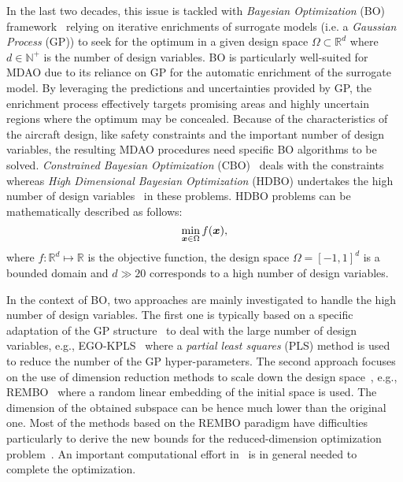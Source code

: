In the last two decades, this issue is tackled with \textit{Bayesian Optimization} (BO) framework~\cite{frazierTutorialBayesianOptimization2018,JonesEfficientglobaloptimization1998,MockusBayesianmethodsseeking1975,ShahriariTakingHumanOut2016} relying on iterative enrichments of surrogate models (i.e. a \textit{Gaussian Process} (GP)) to seek for the optimum in a given design space $\Omega \subset \mathbb{R}^d$ where $d \in \mathbb{N}^+$ is the number of design variables. 
{\color{black} BO is particularly well-suited for MDAO due to its reliance on GP for the automatic enrichment of the surrogate model. 
By leveraging the predictions and uncertainties provided by GP, the enrichment process effectively targets promising areas and highly uncertain regions where the optimum may be concealed.}
Because of the characteristics of the aircraft design, like safety constraints and the important number of design variables, the resulting MDAO procedures need specific BO algorithms to be solved.
\textit{Constrained Bayesian Optimization} (CBO)~\cite{frazierTutorialBayesianOptimization2018,gelbartBayesianOptimizationUnknown2014a,ShahriariTakingHumanOut2016,bartoliAdaptiveModelingStrategy2019,YDIOUANE_2023} deals with the constraints whereas \textit{High Dimensional Bayesian Optimization} (HDBO) undertakes the high number of design variables~\cite{erikssonScalableGlobalOptimization2019a,WangBayesianoptimizationbillion2016,WangBatchedHighdimensionalBayesian2018,binoisChoiceLowdimensionalDomain2020,KandasamyHighdimensionalBayesian2015} in these problems. HDBO problems can be mathematically described as follows:
\begin{equation}
    \min\limits_{\bm{x} \in \Omega} f(\bm{x}),
    \label{eq:opt_prob}
\end{equation}
where $f : \mathbb{R}^d \mapsto \mathbb{R}$ is the objective function, the design space $\Omega = [-1,1]^d$ is a bounded domain and $d \gg 20$ corresponds to  a high number of design variables.

In the context of BO, two approaches are mainly investigated to handle the high number of design variables.
The first one is typically based on a specific adaptation of the GP structure~\cite{BouhlelEfficientglobaloptimization2018,KandasamyHighdimensionalBayesian2015,erikssonScalableConstrainedBayesian2020} to deal with the large number of design variables, e.g., EGO-KPLS~\cite{BouhlelEfficientglobaloptimization2018} where a \textit{partial least squares} (PLS) method is used to reduce the number of the GP hyper-parameters.
The second approach focuses on the use of dimension reduction methods to scale down the design space~\cite{WangBayesianoptimizationbillion2016,WangBatchedHighdimensionalBayesian2018,binoisChoiceLowdimensionalDomain2020}, e.g., REMBO~\cite{WangBayesianoptimizationbillion2016} where a random linear embedding of the initial space is used.
The dimension of the obtained subspace can be hence much lower than the original one.
Most of the methods based on the REMBO paradigm have difficulties particularly to derive the new bounds for the reduced-dimension optimization problem~\cite{WangBatchedHighdimensionalBayesian2018}.
An important computational effort in~\cite{binoisChoiceLowdimensionalDomain2020} is in general needed to complete the optimization.


